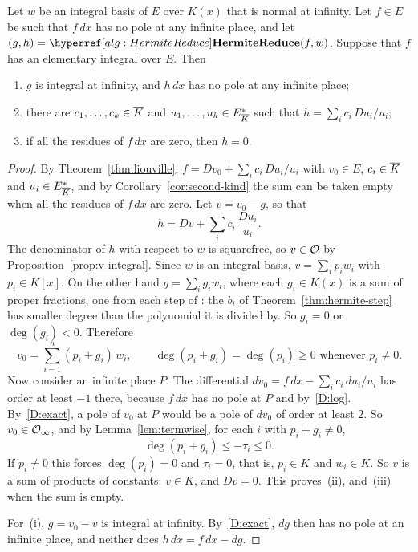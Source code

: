 \begin{theorem}[Trager]\label{thm:algebraic-part}
Let $w$ be an integral basis of $E$ over $K(x)$ that is normal at infinity.
Let $f \in E$ be such that $f\,dx$ has no pole at any infinite place, and let
$(g, h) = \seealg{HermiteReduce}(f, w)$. Suppose that $f$ has an elementary
integral over $E$. Then
\begin{enumerate}[label=\textup{(\roman*)}]
\item $g$ is integral at infinity, and $h\,dx$ has no pole at any infinite
  place;
\item there are $c_1, \dots, c_k \in \overline{K}$ and $u_1, \dots, u_k \in
  E_{\overline{K}}^*$ such that $h = \sum_i c_i\, Du_i / u_i$;
\item if all the residues of $f\,dx$ are zero, then $h = 0$.
\end{enumerate}
\end{theorem}

\begin{proof}
By Theorem~\ref{thm:liouville}, $f = Dv_0 + \sum_i c_i\, Du_i/u_i$ with $v_0
\in E$, $c_i \in \overline{K}$ and $u_i \in E_{\overline{K}}^*$, and by
Corollary~\ref{cor:second-kind} the sum can be taken empty when all the
residues of $f\,dx$ are zero. Let $v = v_0 - g$, so that
\[
  h = Dv + \sum_i c_i\, \frac{Du_i}{u_i} .
\]
The denominator of $h$ with respect to $w$ is squarefree, so $v \in \mathcal{O}$ by
Proposition~\ref{prop:v-integral}. Since $w$ is an integral basis, $v = \sum_i
p_i w_i$ with $p_i \in K[x]$. On the other hand $g = \sum_i g_i w_i$, where
each $g_i \in K(x)$ is a sum of proper fractions, one from each step of
: the $b_i$ of Theorem~\ref{thm:hermite-step} has
smaller degree than the polynomial it is divided by. So $g_i = 0$ or
$\deg(g_i) < 0$. Therefore
\[
  v_0 = \sum_{i=1}^n (p_i + g_i)\, w_i,
  \qquad \deg(p_i + g_i) = \deg(p_i) \ge 0 \text{ whenever } p_i \ne 0 .
\]
Now consider an infinite place $P$. The differential $dv_0 = f\,dx - \sum_i
c_i\, du_i/u_i$ has order at least $-1$ there, because $f\,dx$ has no pole
at $P$ and by~\ref{D:log}. By~\ref{D:exact}, a pole of $v_0$ at $P$ would be
a pole of $dv_0$ of order at least $2$. So $v_0 \in \mathcal{O}_\infty$, and by
Lemma~\ref{lem:termwise}, for each $i$ with $p_i + g_i \ne 0$,
\[
  \deg(p_i + g_i) \le -\tau_i \le 0 .
\]
If $p_i \ne 0$ this forces $\deg(p_i) = 0$ and $\tau_i = 0$, that is, $p_i
\in K$ and $w_i \in K$. So $v$ is a sum of products of constants: $v \in
K$, and $Dv = 0$. This proves~(ii), and~(iii) when the sum is empty.

For~(i), $g = v_0 - v$ is integral at infinity. By~\ref{D:exact}, $dg$ then
has no pole at an infinite place, and neither does $h\,dx = f\,dx - dg$.
\end{proof}

